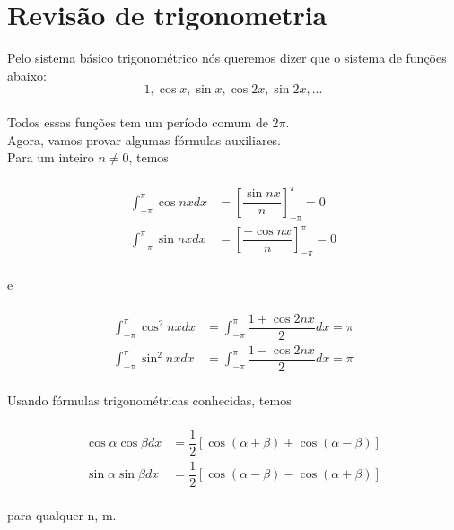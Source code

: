 \documentclass{article}
\begin{document}
\section{Revisão de trigonometria}
Pelo sistema básico trigonométrico nós queremos dizer que o sistema de funções abaixo:\\
\begin{equation}
\label{51}
    1, \cos{x}, \sin{x}, \cos{2x}, \sin{2x}, ... 
\end{equation}
\\
Todos essas funções tem um período comum de $2\pi$.
\\
Agora, vamos provar algumas fórmulas auxiliares.\\
Para um inteiro $n \neq 0$, temos\\
\\
\begin{equation}
\label{52}
    \begin{split}
        \int_{-\pi}^{\pi}\cos{nx}dx & = [\dfrac{\sin{nx}}{n}]_{-\pi}^{\pi} = 0\\
        \int_{-\pi}^{\pi}\sin{nx}dx & = [\dfrac{-\cos{nx}}{n}]_{-\pi}^{\pi} = 0
    \end{split}
\end{equation}
\\
e\\
\\
\begin{equation}
\label{53}
    \begin{split}
        \int_{-\pi}^{\pi}\cos^2{nx}dx & = \int_{-\pi}^{\pi}\dfrac{1 + \cos{2nx}}{2} dx = \pi\\
        \int_{-\pi}^{\pi}\sin^2{nx}dx & = \int_{-\pi}^{\pi}\dfrac{1 - \cos{2nx}}{2} dx = \pi
    \end{split}
\end{equation}
\\ 
Usando fórmulas trigonométricas conhecidas, temos\\
\\
\begin{equation}
\label{54}
    \begin{split}
        \cos{\alpha}\cos{\beta} dx & = \dfrac{1}{2}[\cos{(\alpha + \beta)} + \cos{(\alpha - \beta)}]\\
        \sin{\alpha}\sin{\beta}dx & = \dfrac{1}{2}[\cos{(\alpha - \beta)} - \cos{(\alpha + \beta)}]
    \end{split}
\end{equation}
\\
para qualquer n, m.\\
\end{document}
